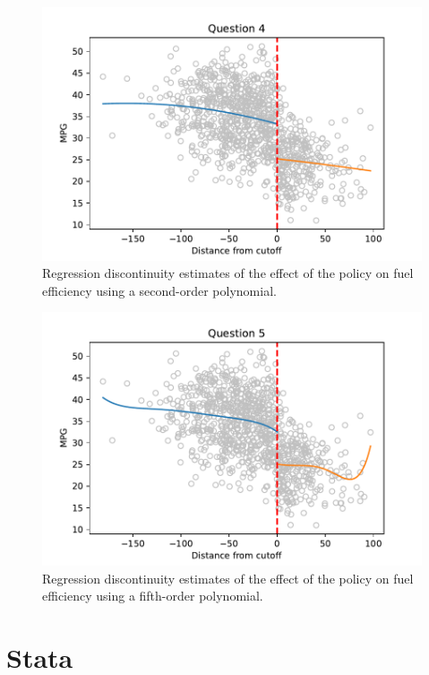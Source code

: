\documentclass{article}
\begin{document}
\begin{figure}[ht]
\centering
\includegraphics{hw6q4.pdf}
\caption{Regression discontinuity estimates of the effect of the policy on fuel efficiency using a second-order polynomial.}
\label{fig:hw6q4}
\end{figure}

\begin{figure}[ht]
\centering
\includegraphics{hw6q5.pdf}
\caption{Regression discontinuity estimates of the effect of the policy on fuel efficiency using a fifth-order polynomial.}
\label{fig:hw6q5}
\end{figure}

\clearpage

\section{Stata}
\end{document}
